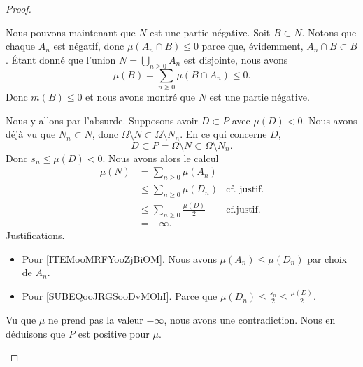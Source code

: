\begin{proof}
\begin{subproof}
		Nous pouvons maintenant que \( N\) est une partie négative. Soit \( B\subset N\). Notons que chaque \( A_n\) est négatif, donc \( \mu(A_n\cap B)\leq 0\) parce que, évidemment, \( A_n\cap B\subset B\). Étant donné que l'union \( N=\bigcup_{n\geq 0}A_n\) est disjointe, nous avons
		\begin{equation}
			\mu(B)=\sum_{n\geq 0}\mu(B\cap A_n)\leq 0.
		\end{equation}
		Donc \( m(B)\leq 0\) et nous avons montré que \( N\) est une partie négative.

		Nous y allons par l'absurde. Supposons avoir \( D\subset P\) avec \( \mu(D)<0\). Nous avons déjà vu que \( N_n\subset N\), donc $\Omega\setminus N\subset \Omega\setminus N_n$. En ce qui concerne \( D\),
		\begin{equation}
			D\subset P=\Omega\setminus N\subset \Omega\setminus N_n.
		\end{equation}
		Donc \( s_n\leq \mu(D)<0\). Nous avons alors le calcul
		\begin{subequations}
			\begin{align}
				\mu(N) & =\sum_{n\geq 0}\mu(A_n)                                                                \\
				       & \leq \sum_{n\geq 0}\mu(D_n)           & \text{cf. justif.}		\label{ITEMooMRFYooZjBiOM} \\
				       & \leq \sum_{n\geq 0}\frac{ \mu(D) }{2} & \text{cf.justif. } \label{SUBEQooJRGSooDvMOhI} \\
				       & =-\infty.
			\end{align}
		\end{subequations}
		Justifications.
		\begin{itemize}
			\item
			      Pour \eqref{ITEMooMRFYooZjBiOM}. Nous avons \( \mu(A_n)\leq \mu(D_n)\) par choix de \( A_n\).
			\item
			      Pour \eqref{SUBEQooJRGSooDvMOhI}. Parce que
			      $\mu(D_n)\leq \frac{ s_n }{2}\leq \frac{ \mu(D) }{2}$.
		\end{itemize}
		Vu que \( \mu\) ne prend pas la valeur \( -\infty\), nous avons une contradiction. Nous en déduisons que \( P\) est positive pour \( \mu\).
	\end{subproof}


\end{proof}
